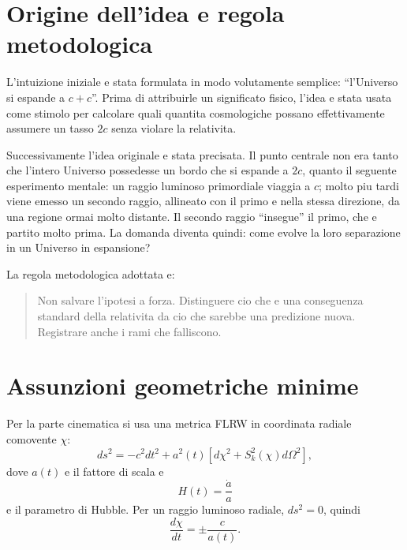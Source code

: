\documentclass[11pt,a4paper]{article}
\begin{document}
\begingroup\linespread{0.947}\selectfont
\tableofcontents
\endgroup
\newpage

\section{Origine dell'idea e regola metodologica}

L'intuizione iniziale e stata formulata in modo volutamente semplice: ``l'Universo si espande a $c+c$''. Prima di attribuirle un significato fisico, l'idea e stata usata come stimolo per calcolare quali quantita cosmologiche possano effettivamente assumere un tasso $2c$ senza violare la relativita.

Successivamente l'idea originale e stata precisata. Il punto centrale non era tanto che l'intero Universo possedesse un bordo che si espande a $2c$, quanto il seguente esperimento mentale: un raggio luminoso primordiale viaggia a $c$; molto piu tardi viene emesso un secondo raggio, allineato con il primo e nella stessa direzione, da una regione ormai molto distante. Il secondo raggio ``insegue'' il primo, che e partito molto prima. La domanda diventa quindi: come evolve la loro separazione in un Universo in espansione?

La regola metodologica adottata e:
\begin{quote}
Non salvare l'ipotesi a forza. Distinguere cio che e una conseguenza standard della relativita da cio che sarebbe una predizione nuova. Registrare anche i rami che falliscono.
\end{quote}

\section{Assunzioni geometriche minime}

Per la parte cinematica si usa una metrica FLRW in coordinata radiale comovente $\chi$:
\begin{equation}
 ds^2=-c^2dt^2+a^2(t)\left[d\chi^2+S_k^2(\chi)d\Omega^2\right],
\end{equation}
dove $a(t)$ e il fattore di scala e
\begin{equation}
 H(t)=\frac{\dot a}{a}
\end{equation}
e il parametro di Hubble. Per un raggio luminoso radiale, $ds^2=0$, quindi
\begin{equation}
 \frac{d\chi}{dt}=\pm\frac{c}{a(t)}.
 \label{eq:null_comoving}
\end{equation}
\end{document}
